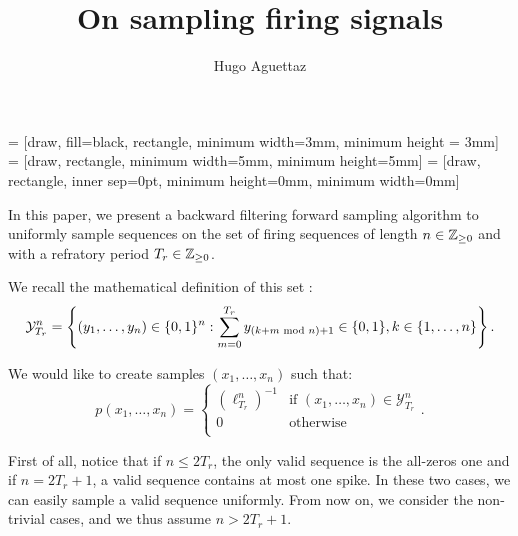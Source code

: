 \documentclass{article}
\title{On sampling firing signals}
\author{Hugo Aguettaz}
\begin{document}
\maketitle
     = [draw, fill=black, rectangle, minimum width=3mm, minimum height = 3mm]
     = [draw, rectangle, minimum width=5mm, minimum height=5mm]
     = [draw, rectangle, inner sep=0pt, minimum height=0mm, minimum width=0mm] 

    In this paper, we present a backward filtering forward sampling algorithm to uniformly sample sequences on the set of 
    firing sequences of length $n \in \mathbb{Z}_{\geq 0}$ and with a refratory period $T_r \in \mathbb{Z}_{\geq 0}$.

    We recall the mathematical definition of this set :
    \begin{equation}
        \mathcal{Y}_{T_r}^n = \left\{ (y_1, \dots, y_n) \in \{0, 1\}^n : \sum_{m=0}^{T_r} y_{(k+m \textnormal{ mod } n) + 1} \in \{0, 1\}, k \in \{1, \dots, n\} \right\}.
    \end{equation}

    We would like to create samples $(x_1, \dots, x_n)$ such that:
    \begin{equation}  
      p (x_1, \dots, x_n) =
      \left\{
        \begin{array}{ll}
          \left(\ell_{T_r}^n\right)^{-1} & \mbox{if } (x_1, \dots, x_n) \in \mathcal{Y}_{T_r}^{n}\\
          0 & \mbox{otherwise} \\
        \end{array}
      \right..
    \end{equation}

    First of all, notice that if $n \leq 2 T_r$, the only valid sequence is the all-zeros one and if $n = 2 T_r + 1$, 
    a valid sequence contains at most one spike. In these two cases, we can easily sample a valid sequence uniformly. From now on,
    we consider the non-trivial cases, and we thus assume $n > 2 T_r + 1$.
  
\end{document}
